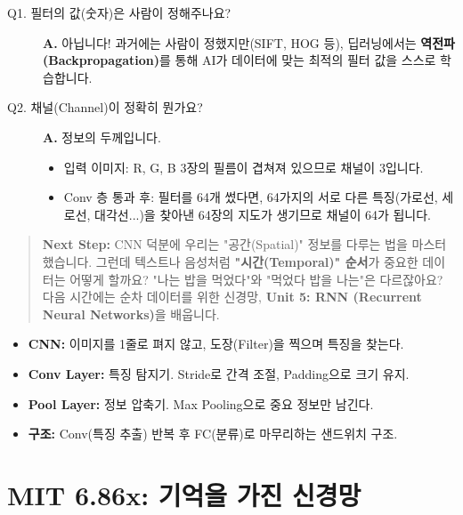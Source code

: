\documentclass[11pt,a4paper]{book}
\theoremstyle{definition}
\begin{document}
\begin{description}
    \item[Q1. 필터의 값(숫자)은 사람이 정해주나요?]
    \textbf{A.} 아닙니다! 과거에는 사람이 정했지만(SIFT, HOG 등), 딥러닝에서는 \textbf{역전파(Backpropagation)}를 통해 AI가 데이터에 맞는 최적의 필터 값을 스스로 학습합니다.
    
    \item[Q2. 채널(Channel)이 정확히 뭔가요?]
    \textbf{A.} 정보의 두께입니다.
    \begin{itemize}
        \item 입력 이미지: R, G, B 3장의 필름이 겹쳐져 있으므로 채널이 3입니다.
        \item Conv 층 통과 후: 필터를 64개 썼다면, 64가지의 서로 다른 특징(가로선, 세로선, 대각선...)을 찾아낸 64장의 지도가 생기므로 채널이 64가 됩니다.
    \end{itemize}
\end{description}

\vspace{1cm}
\begin{quote}
\textbf{Next Step:} CNN 덕분에 우리는 "공간(Spatial)" 정보를 다루는 법을 마스터했습니다. 그런데 텍스트나 음성처럼 \textbf{"시간(Temporal)" 순서}가 중요한 데이터는 어떻게 할까요? "나는 밥을 먹었다"와 "먹었다 밥을 나는"은 다르잖아요? 다음 시간에는 순차 데이터를 위한 신경망, \textbf{Unit 5: RNN (Recurrent Neural Networks)}을 배웁니다.
\end{quote}

\begin{summarybox}[title={Unit 3 (Part B) 핵심 요약}]
\begin{itemize}
    \item \textbf{CNN:} 이미지를 1줄로 펴지 않고, 도장(Filter)을 찍으며 특징을 찾는다.
    \item \textbf{Conv Layer:} 특징 탐지기. Stride로 간격 조절, Padding으로 크기 유지.
    \item \textbf{Pool Layer:} 정보 압축기. Max Pooling으로 중요 정보만 남긴다.
    \item \textbf{구조:} Conv(특징 추출) 반복 후 FC(분류)로 마무리하는 샌드위치 구조.
\end{itemize}
\end{summarybox}


\chapter{MIT 6.86x: 기억을 가진 신경망}
\label{ch:lecture10}
\end{document}
